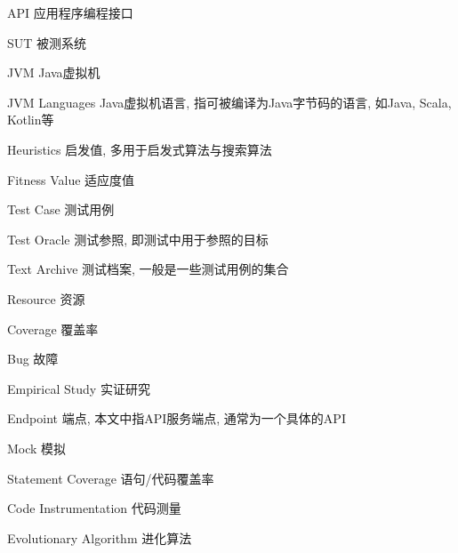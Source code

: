 \begin{denotation}[3cm]
\item[API] 应用程序编程接口
\item[SUT] 被测系统 
\item[JVM] Java虚拟机 
\item[JVM Languages] Java虚拟机语言, 指可被编译为Java字节码的语言, 如Java, Scala, Kotlin等 

\item[Heuristics] 启发值, 多用于启发式算法与搜索算法 
\item[Fitness Value] 适应度值 
\item[Test Case] 测试用例 
\item[Test Oracle] 测试参照, 即测试中用于参照的目标 
\item[Text Archive] 测试档案, 一般是一些测试用例的集合 
\item[Resource] 资源 
\item[Coverage] 覆盖率 
\item[Bug] 故障 
\item[Empirical Study] 实证研究 
\item[Endpoint] 端点, 本文中指API服务端点, 通常为一个具体的API
\item[Mock] 模拟 
\item[Statement Coverage] 语句/代码覆盖率 
\item[Code Instrumentation] 代码测量 
\item[Evolutionary Algorithm] 进化算法 
\end{denotation}

